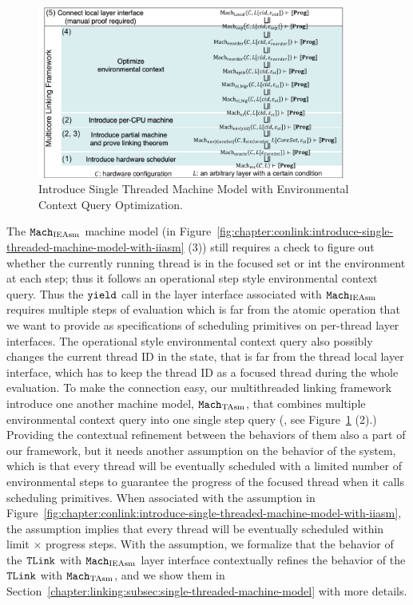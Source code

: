 \begin{figure}
\begin{center}
\includegraphics[width=0.9\textwidth, page=8]{figs/conlink/concurrent_linking}
\end{center}
\caption{Introduce Single Threaded Machine Model with Environmental Context Query Optimization.}
\label{fig:chapter:conlink:introduce-single-threaded-machine-model-with-tasm}
\end{figure}

The ${\mathrm{\texttt{Mach}}}_{\mathrm{IEAsm}}$ machine model  (in Figure~\ref{fig:chapter:conlink:introduce-single-threaded-machine-model-with-iiasm}  (3)) still requires a check to figure out whether the currently running thread is in the focused set or int the environment at each step; thus it follows an operational step style environmental context query.
Thus the ${\mathrm{\texttt{yield}}}$ call in the layer interface associated with ${\mathrm{\texttt{Mach}}}_{\mathrm{IEAsm}}$ requires multiple steps of evaluation which is 
far from the atomic operation that we want to provide as specifications of scheduling primitives on per-thread layer interfaces.
The operational style environmental context query also possibly changes 
the current thread ID in the state, that is far from the thread local layer interface, which has to keep the thread ID as a focused thread during the whole evaluation.
To make the connection easy,
our multithreaded linking framework introduce one another machine model, ${\mathrm{\texttt{Mach}}}_{\mathrm{TAsm}}$, 
that combines multiple environmental context query into one single step query (\ie, see Figure~\ref{fig:chapter:conlink:introduce-single-threaded-machine-model-with-tasm} (2).)
Providing the contextual refinement between the behaviors of them also a part of
our framework, but it needs 
another assumption on the behavior of the system,
which is that every thread will be eventually scheduled with a limited number of 
environmental steps to guarantee the progress of the focused thread when it calls scheduling primitives. 
When associated with the assumption in Figure~\ref{fig:chapter:conlink:introduce-single-threaded-machine-model-with-iiasm},
the assumption implies that every thread will be eventually scheduled within limit $\times$ progress steps.
With the assumption, 
we formalize 
that the behavior of  the ${{\mathrm{\texttt{TLink}}}}$ with ${\mathrm{\texttt{Mach}}}_{\mathrm{IEAsm}}$ layer interface  contextually refines
the behavior of  the ${{\mathrm{\texttt{TLink}}}}$ with ${\mathrm{\texttt{Mach}}}_{\mathrm{TAsm}}$, and 
we show them in Section~\ref{chapter:linking:subsec:single-threaded-machine-model} with more details.


